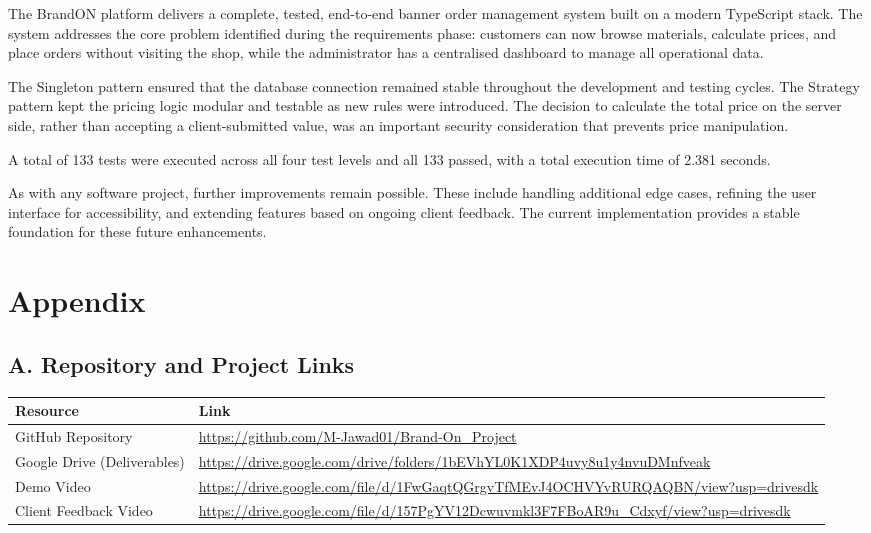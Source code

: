 \documentclass[12pt, a4paper]{article}
\begin{document}
The BrandON platform delivers a complete, tested, end-to-end banner order management system built on a modern TypeScript stack. The system addresses the core problem identified during the requirements phase: customers can now browse materials, calculate prices, and place orders without visiting the shop, while the administrator has a centralised dashboard to manage all operational data.

The Singleton pattern ensured that the database connection remained stable throughout the development and testing cycles. The Strategy pattern kept the pricing logic modular and testable as new rules were introduced. The decision to calculate the total price on the server side, rather than accepting a client-submitted value, was an important security consideration that prevents price manipulation.

A total of 133 tests were executed across all four test levels and all 133 passed, with a total execution time of 2.381 seconds.

As with any software project, further improvements remain possible. These include handling additional edge cases, refining the user interface for accessibility, and extending features based on ongoing client feedback. The current implementation provides a stable foundation for these future enhancements.
\appendix
\section*{Appendix}

\subsection*{A. Repository and Project Links}

\begin{table}[H]
\centering
\begin{tabularx}{\textwidth}{lX}
\toprule
\textbf{Resource} & \textbf{Link} \\
\midrule
GitHub Repository & \url{https://github.com/M-Jawad01/Brand-On_Project} \\
Google Drive (Deliverables) & \url{https://drive.google.com/drive/folders/1bEVhYL0K1XDP4uvy8u1y4nvuDMnfveak} \\
Demo Video & \url{https://drive.google.com/file/d/1FwGaqtQGrgvTfMEvJ4OCHVYvRURQAQBN/view?usp=drivesdk} \\
Client Feedback Video & \url{https://drive.google.com/file/d/157PgYV12Dcwuvmkl3F7FBoAR9u_Cdxyf/view?usp=drivesdk} \\
\bottomrule
\end{tabularx}
\end{table}
\end{document}
